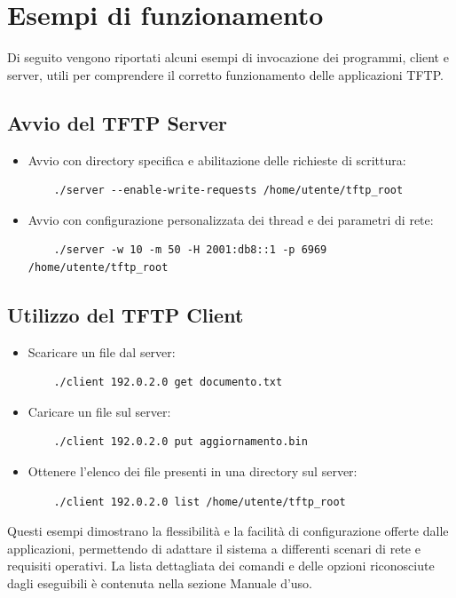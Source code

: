 \documentclass[12pt]{article}
\begin{document}
\section{Esempi di funzionamento} {

Di seguito vengono riportati alcuni esempi di invocazione dei programmi, client e server, utili per comprendere il corretto funzionamento delle applicazioni TFTP.

\subsection{Avvio del TFTP Server}
\begin{itemize}
    \item Avvio con directory specifica e abilitazione delle richieste di scrittura:
    \begin{verbatim}
    ./server --enable-write-requests /home/utente/tftp_root
    \end{verbatim}
    \item Avvio con configurazione personalizzata dei thread e dei parametri di rete:
    \begin{verbatim}
    ./server -w 10 -m 50 -H 2001:db8::1 -p 6969 /home/utente/tftp_root
    \end{verbatim}
\end{itemize}

\pagebreak
\subsection{Utilizzo del TFTP Client}
\begin{itemize}
    \item Scaricare un file dal server:
    \begin{verbatim}
    ./client 192.0.2.0 get documento.txt
    \end{verbatim}
    \item Caricare un file sul server:
    \begin{verbatim}
    ./client 192.0.2.0 put aggiornamento.bin
    \end{verbatim}
    \item Ottenere l'elenco dei file presenti in una directory sul server:
    \begin{verbatim}
    ./client 192.0.2.0 list /home/utente/tftp_root
    \end{verbatim}
\end{itemize}

Questi esempi dimostrano la flessibilità e la facilità di configurazione offerte dalle applicazioni, permettendo di adattare il sistema a differenti scenari di rete e requisiti operativi. La lista dettagliata dei comandi e delle opzioni riconosciute dagli eseguibili è contenuta nella sezione Manuale d'uso.
    
}
\end{document}
